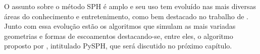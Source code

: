 O assunto sobre o método SPH é amplo e seu uso tem evoluído nas mais diversas áreas do conhecimento e entretenimento, como bem destacado no trabalho de . Junto com essa evolução estão os algoritmos que simulam as mais variadas geometrias e formas de escoamentos destacando-se, entre eles, o algoritmo proposto por , intitulado PySPH, que será discutido no próximo capítulo.  


